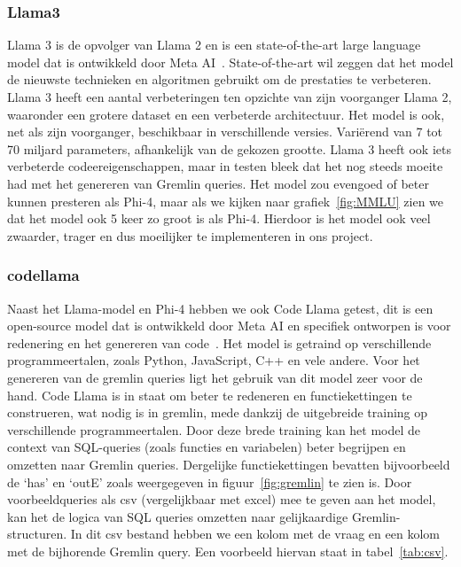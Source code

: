 \subsubsection{Llama3}
Llama 3 is de opvolger van Llama 2 en is een state-of-the-art large language model dat is ontwikkeld door Meta AI~\autocite{Meta2024}.
State-of-the-art wil zeggen dat het model de nieuwste technieken en algoritmen gebruikt om de prestaties te verbeteren.
Llama 3 heeft een aantal verbeteringen ten opzichte van zijn voorganger Llama 2, waaronder een grotere dataset en een verbeterde architectuur.
Het model is ook, net als zijn voorganger, beschikbaar in verschillende versies. Variërend van 7 tot 70 miljard parameters, afhankelijk van de gekozen grootte.
Llama 3 heeft ook iets verbeterde codeereigenschappen, maar in testen bleek dat het nog steeds moeite had met het genereren van Gremlin queries.
Het model zou evengoed of beter kunnen presteren als Phi-4, maar als we kijken naar grafiek~\ref{fig:MMLU} zien we dat het model ook 5 keer zo groot is als Phi-4.
Hierdoor is het model ook veel zwaarder, trager en dus moeilijker te implementeren in ons project. 

\subsubsection{codellama}
Naast het Llama-model en Phi-4 hebben we ook Code Llama getest, dit is een open-source model dat is ontwikkeld door Meta AI en specifiek ontworpen is voor redenering en het genereren van code~\autocite{codellama}.
Het model is getraind op verschillende programmeertalen, zoals Python, JavaScript, C++ en vele andere. Voor het genereren van de gremlin queries ligt het gebruik van dit model zeer voor de hand.
Code Llama is in staat om beter te redeneren en functiekettingen te construeren, wat nodig is in gremlin, mede dankzij de uitgebreide training op verschillende programmeertalen.\@
Door deze brede training kan het model de context van SQL-queries (zoals functies en variabelen) beter begrijpen en omzetten naar Gremlin queries.
Dergelijke functiekettingen bevatten bijvoorbeeld de `has' en `outE' zoals weergegeven in figuur~\ref{fig:gremlin} te zien is.
Door voorbeeldqueries als csv (vergelijkbaar met excel) mee te geven aan het model, kan het de logica van SQL queries omzetten naar gelijkaardige Gremlin-structuren.
In dit csv bestand hebben we een kolom met de vraag en een kolom met de bijhorende Gremlin query.
Een voorbeeld hiervan staat in tabel~\ref{tab:csv}.

